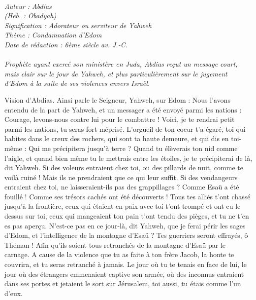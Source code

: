 \BFont
\noindent\hrulefill
{\footnotesize
\textit{
\bigskip
{\centering{}
\\Auteur : Abdias
\\(Heb. : Obadyah)
\\Signification : Adorateur ou serviteur de Yahweh
\\Thème : Condamnation d'Edom
\\Date de rédaction : 6ème siècle av. J.-C.\\}
}
\textit{
\\Prophète ayant exercé son ministère en Juda, Abdias reçut un message court, mais clair sur le jour de Yahweh, et plus particulièrement sur le jugement d’Edom à la suite de ses violences envers Israël.\bigskip
}
}
\par\nobreak\noindent\hrulefill
\begin{multicols}{2}
\VerseOne{}Vision d'Abdias. Ainsi parle le Seigneur, Yahweh, sur Edom : Nous l’avons entendu de la part de Yahweh, et un messager a été envoyé parmi les nations : Courage, levons-nous contre lui pour le combattre !
Voici, je te rendrai petit parmi les nations, tu seras fort méprisé.
L'orgueil de ton coeur t'a égaré, toi qui habites dans le creux des rochers, qui sont ta haute demeure, et qui dis en toi-même : Qui me précipitera jusqu’à terre ?
Quand tu élèverais ton nid comme l'aigle, et quand bien même tu le mettrais entre les étoiles, je te précipiterai de là, dit Yahweh.
Si des voleurs entraient chez toi, ou des pillards de nuit, comme te voilà ruiné ! Mais ils ne prendraient que ce qui leur suffit. Si des vendangeurs entraient chez toi, ne laisseraient-ils pas des grappillages ?
Comme Esaü a été fouillé ! Comme ses trésors cachés ont été découverts !
Tous tes alliés t'ont chassé jusqu'à la frontière, ceux qui étaient en paix avec toi t'ont trompé et ont eu le dessus sur toi, ceux qui mangeaient ton pain t'ont tendu des pièges, et tu ne t’en es pas aperçu.
N’est-ce pas en ce jour-là, dit Yahweh, que je ferai périr les sages d'Edom, et l’intelligence de la montagne d'Esaü ?
Tes guerriers seront effrayés, ô Théman ! Afin qu’ils soient tous retranchés de la montagne d'Esaü par le carnage.
A cause de la violence que tu as faite à ton frère Jacob, la honte te couvrira, et tu seras retranché à jamais.
Le jour où tu te tenais en face de lui, le jour où des étrangers emmenaient captive son armée, où des inconnus entraient dans ses portes et jetaient le sort sur Jérusalem, toi aussi, tu étais comme l'un d'eux.

\end{multicols}

